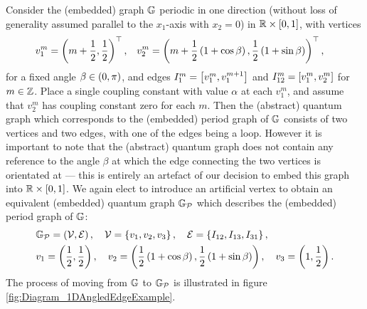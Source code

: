 Consider the (embedded) graph $\mathbb{G}$ periodic in one direction (without loss of generality assumed parallel to the $x_1$-axis with $x_2=0$) in $\mathbb{R}\times\left[ 0,1 \right]$, with vertices
\begin{align*}
	v_1^m = \left( m + \frac{1}{2}, \frac{1}{2} \right)^\top, 
	&\quad v_2^m = \left( m + \frac{1}{2}\left( 1+\cos\beta \right), \frac{1}{2}\left( 1+\sin\beta \right) \right)^\top,
\end{align*}
for a fixed angle $\beta\in\left( 0,\pi \right)$, and edges $I_{1}^{m} = \left[ v_1^m, v_1^{m+1} \right]$ and $I_{12}^m=\left[ v_1^m, v_2^m \right]$ for $m\in\mathbb{Z}$.
Place a single coupling constant with value $\alpha$ at each $v_1^m$, and assume that $v_2^m$ has coupling constant zero for each $m$.
Then the (abstract) quantum graph which corresponds to the (embedded) period graph of $\mathbb{G}$ consists of two vertices and two edges, with one of the edges being a loop.
However it is important to note that the (abstract) quantum graph does not contain any reference to the angle $\beta$ at which the edge connecting the two vertices is orientated at --- this is entirely an artefact of our decision to embed this graph into $\mathbb{R}\times\left[ 0,1 \right]$.
We again elect to introduce an artificial vertex to obtain an equivalent (embedded) quantum graph $\mathbb{G}_{\mathcal{P}}$ which describes the (embedded) period graph of $\mathbb{G}$:
\begin{align*}
	&\mathbb{G}_{\mathcal{P}} = \left( \mathcal{V}, \mathcal{E} \right), \quad
	\mathcal{V} = \left\{  v_1, v_2, v_3  \right\}, \quad
	\mathcal{E} = \left\{  I_{12}, I_{13}, I_{31}  \right\}, \\
	&v_1 = \left( \frac{1}{2},\frac{1}{2} \right), \quad
	v_2 = \left( \frac{1}{2}\left( 1+\cos\beta \right), \frac{1}{2}\left( 1+\sin\beta \right) \right), \quad
	v_3 = \left( 1, \frac{1}{2} \right).
\end{align*}
The process of moving from $\mathbb{G}$ to $\mathbb{G}_{\mathcal{P}}$ is illustrated in figure \ref{fig:Diagram_1DAngledEdgeExample}.
